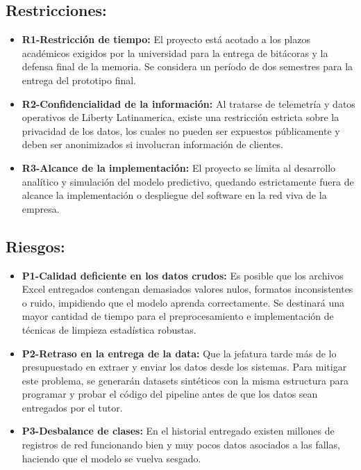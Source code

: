 \documentclass[12pt,a4paper]{article}
\begin{document}
        \subsection{\textbf{Restricciones:}} 
                    \begin{itemize}
                        \item \textbf{R1-Restricción de tiempo:} El proyecto está acotado a los plazos académicos exigidos por la universidad para la entrega de bitácoras y la defensa final de la memoria. Se considera un período de dos semestres para la entrega del prototipo final.
                        \item \textbf{R2-Confidencialidad de la información:} Al tratarse de telemetría y datos operativos de Liberty Latinamerica, existe una restricción estricta sobre la privacidad de los datos, los cuales no pueden ser expuestos públicamente y deben ser anonimizados si involucran información de clientes.
                        \item \textbf{R3-Alcance de la implementación:} El proyecto se limita al desarrollo analítico y simulación del modelo predictivo, quedando estrictamente fuera de alcance la implementación o despliegue del software en la red viva de la empresa.
                    \end{itemize}
        \subsection{\textbf{Riesgos:}}
        \label{subsec:riesgos}
                    \begin{itemize}
                        \item \textbf{P1-Calidad deficiente en los datos crudos:} Es posible que los archivos Excel entregados contengan demasiados valores nulos, formatos inconsistentes o ruido, impidiendo que el modelo aprenda correctamente. Se destinará una mayor cantidad de tiempo para el preprocesamiento e implementación de técnicas de limpieza estadística robustas.
                        \item \textbf{P2-Retraso en la entrega de la data:} Que la jefatura tarde más de lo presupuestado en extraer y enviar los datos desde los sistemas. Para mitigar este problema, se generarán datasets sintéticos con la misma estructura para programar y probar el código del pipeline antes de que los datos sean entregados por el tutor.
                        \item \textbf{P3-Desbalance de clases:} En el historial entregado existen millones de registros de red funcionando bien y muy pocos datos asociados a las fallas, haciendo que el modelo se vuelva sesgado.
                    \end{itemize}
\end{document}
